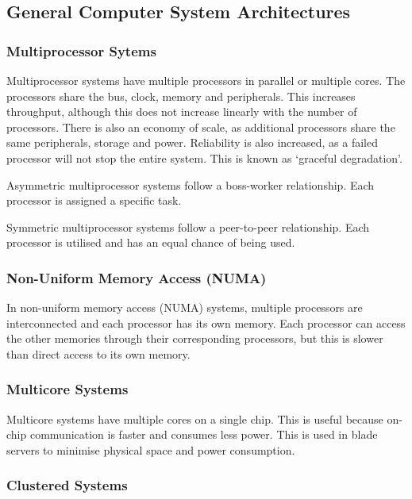 \subsection{General Computer System Architectures}

\subsubsection{Multiprocessor Sytems}

Multiprocessor systems have multiple processors in parallel or multiple cores.
The processors share the bus, clock, memory and peripherals.
This increases throughput, although this does not increase linearly with the number of processors.
There is also an economy of scale, as additional processors share the same peripherals, storage and power.
Reliability is also increased, as a failed processor will not stop the entire system.
This is known as `graceful degradation'.

Asymmetric multiprocessor systems follow a boss-worker relationship.
Each processor is assigned a specific task.

Symmetric multiprocessor systems follow a peer-to-peer relationship.
Each processor is utilised and has an equal chance of being used.

\subsubsection{Non-Uniform Memory Access (NUMA)}

In non-uniform memory access (NUMA) systems, multiple processors are interconnected and each processor has its own memory.
Each processor can access the other memories through their corresponding processors, but this is slower than direct access to its own memory.

\subsubsection{Multicore Systems}

Multicore systems have multiple cores on a single chip.
This is useful because on-chip communication is faster and consumes less power.
This is used in blade servers to minimise physical space and power consumption.

\subsubsection{Clustered Systems}

